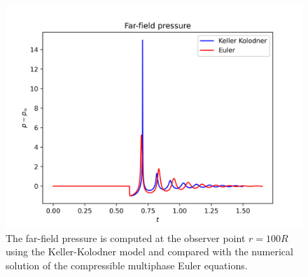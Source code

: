 \documentclass[a4paper]{article}
\begin{document}
\begin{figure}[!h]
    \centering
    \includegraphics[scale=0.6]{images/pressure.png}
    \caption{The far-field pressure is computed at the observer point $r = 100R$ using the Keller-Kolodner model and compared with the numerical solution of the compressible multiphase Euler equations.
    }
\end{figure}

\printbibliography
\end{document}
